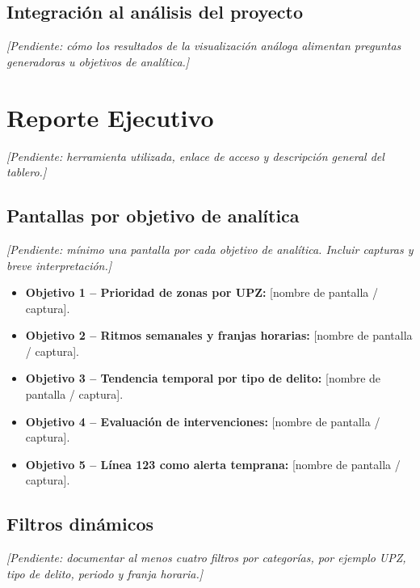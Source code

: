 \documentclass[12pt,letterpaper]{article}
\begin{document}
\subsection{Integración al análisis del proyecto}

\textit{[Pendiente: cómo los resultados de la visualización análoga alimentan preguntas generadoras u objetivos de analítica.]}

\section{Reporte Ejecutivo}

\textit{[Pendiente: herramienta utilizada, enlace de acceso y descripción general del tablero.]}

\subsection{Pantallas por objetivo de analítica}

\textit{[Pendiente: mínimo una pantalla por cada objetivo de analítica. Incluir capturas y breve interpretación.]}
\begin{itemize}
    \item \textbf{Objetivo 1 -- Prioridad de zonas por UPZ:} [nombre de pantalla / captura].
    \item \textbf{Objetivo 2 -- Ritmos semanales y franjas horarias:} [nombre de pantalla / captura].
    \item \textbf{Objetivo 3 -- Tendencia temporal por tipo de delito:} [nombre de pantalla / captura].
    \item \textbf{Objetivo 4 -- Evaluación de intervenciones:} [nombre de pantalla / captura].
    \item \textbf{Objetivo 5 -- Línea 123 como alerta temprana:} [nombre de pantalla / captura].
\end{itemize}

\subsection{Filtros dinámicos}

\textit{[Pendiente: documentar al menos cuatro filtros por categorías, por ejemplo UPZ, tipo de delito, periodo y franja horaria.]}

\end{document}
